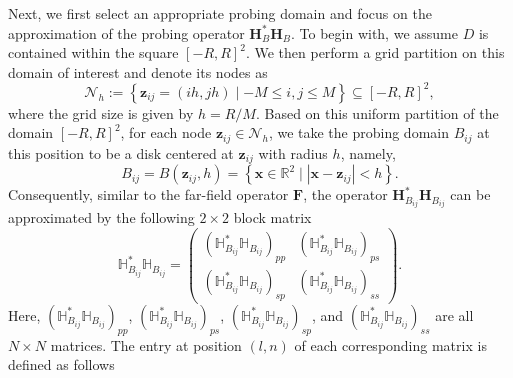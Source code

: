 \documentclass[11pt,reqno,twoside]{amsart}
\theoremstyle{definition}
\theoremstyle{remark}
\numberwithin{equation}{section}
\begin{document}
Next, we first select an appropriate probing domain and focus on the approximation of the probing operator \( \mathbf H_B^* \mathbf H_B \). To begin with, we assume \( D \) is contained within the square \( [-R, R]^2 \). We then perform a grid partition on this domain of interest and denote its nodes as
\begin{equation*}%
\mathcal{N}_h := \left\{ \mathbf z_{ij} = (ih, jh) \mid -M \leq i,j \leq M \right\} \subseteq [-R, R]^2,
\end{equation*}
where the grid size is given by \( h = {R}/{M} \). Based on this uniform partition of the domain \( [-R, R]^2 \), for each node \( \mathbf z_{ij} \in \mathcal{N}_h \), we take the probing domain \(B_{ij}\) at this position to be a disk centered at \(\mathbf z_{ij} \) with radius \( h \), namely,
\begin{equation*}%
B_{ij} = B(\mathbf{z}_{ij}, h) = \left\{ \mathbf{x} \in \mathbb{R}^2 \mid |\mathbf{x} - \mathbf{z}_{ij}| < h \right\}.
\end{equation*}
Consequently, similar to the far-field operator $\mathbf{F}$, the operator \( \mathbf{H}_{B_{ij}}^* \mathbf{H}_{B_{ij}} \) can be approximated by the following \( 2 \times 2 \) block matrix
\begin{equation*}%
\mathbb{H}_{ B_{ij}}^* \mathbb{H}_{ B_{ij}} = 
\begin{pmatrix}
	(\mathbb{H}_{ B_{ij}}^* \mathbb{H}_{ B_{ij}})_{pp} & (\mathbb{H}_{ B_{ij}}^* \mathbb{H}_{ B_{ij}})_{ps} \\
	(\mathbb{H}_{ B_{ij}}^* \mathbb{H}_{ B_{ij}})_{sp} & (\mathbb{H}_{ B_{ij}}^* \mathbb{H}_{ B_{ij}})_{ss}
\end{pmatrix}.
\end{equation*}
Here, \( (\mathbb{H}_{ B_{ij}}^* \mathbb{H}_{ B_{ij}})_{pp} \), \( (\mathbb{H}_{ B_{ij}}^* \mathbb{H}_{ B_{ij}})_{ps} \), \( (\mathbb{H}_{ B_{ij}}^* \mathbb{H}_{ B_{ij}})_{sp} \), and \( (\mathbb{H}_{ B_{ij}}^* \mathbb{H}_{ B_{ij}})_{ss} \) are all \( N \times N \) matrices. The entry at position \( (l,n) \) of each corresponding matrix is defined as follows
\end{document}
